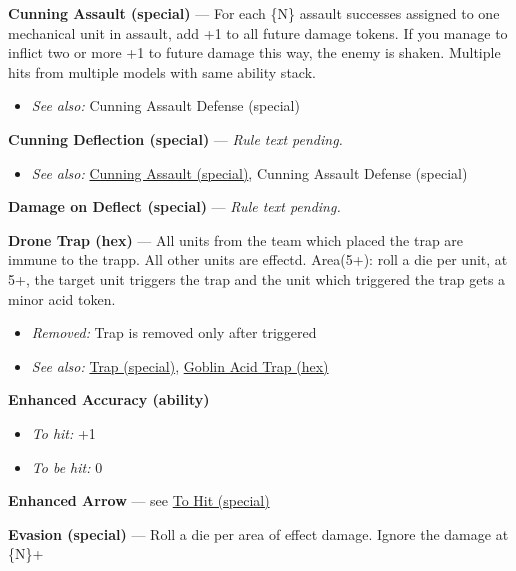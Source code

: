 \documentclass[a4paper,12pt]{article}
\begin{document}
\label{rule-special-cunning-assault}%
\noindent\textbf{Cunning Assault (special)} --- For each \{N\} assault successes assigned to one mechanical unit in assault, add +1 to all future damage tokens. If you manage to inflict two or more +1 to future damage this way, the enemy is shaken. Multiple hits from multiple models with same ability stack.
\begin{itemize}
\item \textit{See also:} Cunning Assault Defense (special)
\end{itemize}


\label{rule-special-cunning-deflection}%
\noindent\textbf{Cunning Deflection (special)} --- \textit{Rule text pending.}\begin{itemize}
\item \textit{See also:} \hyperref[rule-special-cunning-assault]{Cunning Assault (special)}, Cunning Assault Defense (special)
\end{itemize}


\label{rule-special-damage-on-deflect}%
\noindent\textbf{Damage on Deflect (special)} --- \textit{Rule text pending.}

\label{rule-hex-drone-trap}%
\noindent\textbf{Drone Trap (hex)} --- All units from the team which placed the trap are immune to the trapp. All other units are effectd. Area(5+): roll a die per unit, at 5+, the target unit triggers the trap and the unit which triggered the trap gets a minor acid token.
\begin{itemize}
\item \textit{Removed:} Trap is removed only after triggered
\item \textit{See also:} \hyperref[rule-special-trap]{Trap (special)}, \hyperref[rule-hex-goblin-acid-trap]{Goblin Acid Trap (hex)}
\end{itemize}


\label{rule-ability-enhanced-accuracy}%
\noindent\textbf{Enhanced Accuracy (ability)}\begin{itemize}
\item \textit{To hit:} +1
\item \textit{To be hit:} 0
\end{itemize}


\label{rule-alias-enhanced-arrow}%
\noindent\textbf{Enhanced Arrow} --- see \hyperref[rule-special-to-hit]{To Hit (special)}

\label{rule-special-evasion}%
\noindent\textbf{Evasion (special)} --- Roll a die per area of effect damage. Ignore the damage at \{N\}+
\end{document}
